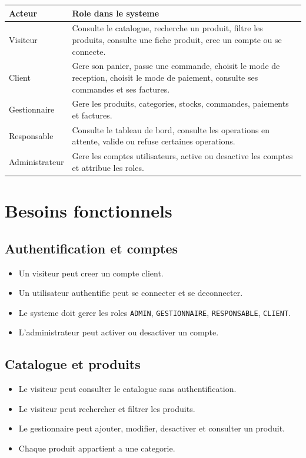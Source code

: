 \documentclass[12pt,a4paper]{article}
\begin{document}
\begin{longtable}{|>{\raggedright\arraybackslash}p{3cm}|>{\raggedright\arraybackslash}p{10cm}|}
\hline
\textbf{Acteur} & \textbf{Role dans le systeme} \\
\hline
Visiteur & Consulte le catalogue, recherche un produit, filtre les produits, consulte une fiche produit, cree un compte ou se connecte. \\
\hline
Client & Gere son panier, passe une commande, choisit le mode de reception, choisit le mode de paiement, consulte ses commandes et ses factures. \\
\hline
Gestionnaire & Gere les produits, categories, stocks, commandes, paiements et factures. \\
\hline
Responsable & Consulte le tableau de bord, consulte les operations en attente, valide ou refuse certaines operations. \\
\hline
Administrateur & Gere les comptes utilisateurs, active ou desactive les comptes et attribue les roles. \\
\hline
\end{longtable}

\section{Besoins fonctionnels}

\subsection{Authentification et comptes}
\begin{itemize}
  \item Un visiteur peut creer un compte client.
  \item Un utilisateur authentifie peut se connecter et se deconnecter.
  \item Le systeme doit gerer les roles \texttt{ADMIN}, \texttt{GESTIONNAIRE}, \texttt{RESPONSABLE}, \texttt{CLIENT}.
  \item L'administrateur peut activer ou desactiver un compte.
\end{itemize}

\subsection{Catalogue et produits}
\begin{itemize}
  \item Le visiteur peut consulter le catalogue sans authentification.
  \item Le visiteur peut rechercher et filtrer les produits.
  \item Le gestionnaire peut ajouter, modifier, desactiver et consulter un produit.
  \item Chaque produit appartient a une categorie.
\end{itemize}
\end{document}
